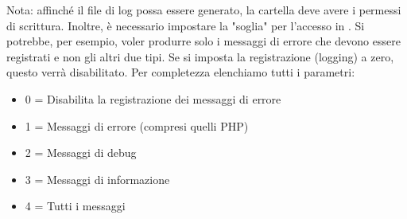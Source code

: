 \begin{itemize}
Nota: affinché il file di log possa essere generato, la cartella  deve avere i permessi di scrittura. Inoltre, è necessario impostare la "soglia" per l'accesso in . Si potrebbe, per esempio, voler produrre solo i messaggi di errore che devono essere registrati e non gli altri due tipi. Se si imposta la registrazione (logging) a zero, questo verrà disabilitato. Per completezza elenchiamo tutti i parametri:

\begin{itemize}
\item 0 = Disabilita la registrazione dei messaggi di errore
\item 1 = Messaggi di errore (compresi quelli PHP)
\item 2 = Messaggi di debug
\item 3 = Messaggi di informazione
\item 4 = Tutti i messaggi
\end{itemize}
\end{itemize}